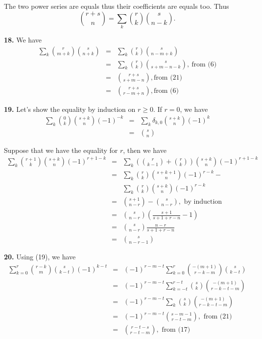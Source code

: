 \documentclass[a4paper,12pt]{article}
\newcommand{\newpar}[1]{\bigskip \noindent \textbf{#1.}}
\begin{document}
The two power series are equals thus their coefficients are equals
too.  Thus
\[ {{r+s} \choose n} = \sum_k {r \choose k} {s \choose {n-k}}.\]

\newpar{18} We have
\begin{eqnarray*}
  \sum_k {r \choose {m+k}} {s \choose {n+k}} &=& \sum_k {r \choose k}
      {s \choose {n-m+k}} \\
  &=& \sum_k {r \choose k} {s \choose {s+m-n-k}},\ \mbox{from (6)} \\
  &=& {{r+s} \choose {s+m-n}}, \mbox{from (21)}\\
  &=& {{r+s} \choose {r-m+n}}, \mbox{from (6)}
\end{eqnarray*}

\newpar{19} Let's show the equality by induction on $r \ge 0$.  If
$r=0$, we have
\begin{eqnarray*}
  \sum_k {0 \choose k} {s+k \choose n}(-1)^{-k} &=& \sum_k \delta_{k,0}
  {s+k \choose n}(-1)^{k} \\
  &=& {s \choose n}
\end{eqnarray*}

Suppose that we have the equality for $r$, then we have
\begin{eqnarray*}
  \sum_k {{r+1} \choose k} {s+k \choose n}(-1)^{r+1-k} &=&
  \sum_k \left( {r \choose {k-1}} + {r \choose k} \right) {s+k \choose n} (-1)^{r+1-k} \\
  &=& \sum_k {r \choose k} {s+k+1 \choose n} (-1)^{r-k} -\\
  && \sum_k {r \choose k} {s+k \choose n}
  (-1)^{r-k} \\
  &=& {{s+1} \choose {n-r}} - {s \choose {n-r}},\mbox{ by induction} \\
  &=& {s \choose {n-r}} \left( \frac{s+1}{s+1+r-n} - 1 \right) \\
  &=& {s \choose {n-r}} \frac{n-r}{s+1+r-n} \\
  &=& {s \choose {n-r-1}}
\end{eqnarray*}

\newpar{20} Using (19), we have
\begin{eqnarray*}
  \sum_{k=0}^r {{r-k} \choose m} {s \choose {k-t}} (-1)^{k-t} &=&
  (-1)^{r-m-t} \sum_{k=0}^r {{-(m+1)} \choose {r-k-m}} {s \choose
    {k-t}} \\
  &=& (-1)^{r-m-t} \sum_{k=-t}^{r-t} {s \choose k} {{-(m+1)} \choose {r-k-t-m}} \\
  &=& (-1)^{r-m-t} \sum_k {s \choose k} {{-(m+1)} \choose {r-k-t-m}} \\
  &=& (-1)^{r-m-t} {{s-m-1} \choose {r-t-m}}, \mbox{ from (21)} \\
  &=& {{r-t-s} \choose {r-t-m}},\mbox{ from (17)}
\end{eqnarray*}
\end{document}
